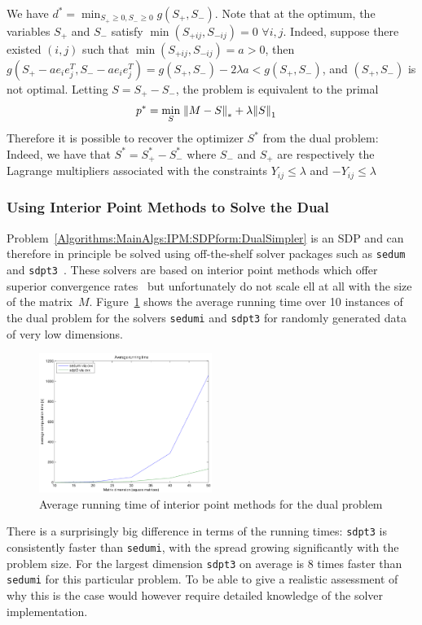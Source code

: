 \documentclass{../../common/projectreport}
\begin{document}
We have $d^* = \min_{S_+\geq 0, S_-\geq 0} g(S_+, S_-)$. Note that at the optimum, the variables $S_+$ and $S_-$ satisfy $\min (S_{+ij}, S_{-ij}) = 0$ $\forall i,j$. Indeed, suppose there existed $(i,j)$ such that $\min(S_{+ij}, S_{-ij}) = a > 0$, then $g(S_+ - ae_ie_j^T, S_- - ae_ie_j^T) = g(S_+, S_-) - 2\lambda a < g(S_+, S_-)$, and $(S_+, S_-)$ is not optimal. Letting $S = S_+ - S_-$, the problem is equivalent to the primal~
\begin{align*}
p^* = \min_{S} \; &{\left\|M-S\right\|}_{*}^{} + \lambda {\left\|S\right\|}_{1}^{} 
\end{align*}
Therefore it is possible to recover the optimizer $S^*$ from the dual problem: Indeed, we have that $S^* = S_+^* - S_-^*$ where $S_-$ and $S_+$ are respectively the Lagrange multipliers associated with the constraints $Y_{ij} \leq \lambda$ and $-Y_{ij} \leq \lambda$



\subsubsection{Using Interior Point Methods to Solve the Dual}
\label{Algorithms:MainAlgs:IPM:Complexity:Subsubsec}

Problem~\eqref{Algorithms:MainAlgs:IPM:SDPform:DualSimpler} is an SDP and can therefore in principle be solved using off-the-shelf solver packages such as \texttt{sedum}~\cite{Sturm:1999uq} and \texttt{sdpt3}~\cite{Toh:1999kx}. These solvers are based on interior point methods which offer superior convergence rates~\cite{Boyd:2004aa} but unfortunately do not scale ell at all with the size of the matrix~$M$. Figure~\ref{Algorithms:MainAlgs:IPM:Complexity:figure} shows the average running time over 10 instances of the dual problem for the solvers \texttt{sedumi} and \texttt{sdpt3} for randomly generated data of very low dimensions. 
%
\begin{figure}[htbp]
\centering
\includegraphics[width=0.5\textwidth]{../figures/intpt_comparison}
\caption{Average running time of interior point methods for the dual problem}
\label{Algorithms:MainAlgs:IPM:Complexity:figure}
\end{figure}
%
There is a surprisingly big difference in terms of the running times: \texttt{sdpt3} is consistently faster than \texttt{sedumi}, with the spread growing significantly with the problem size. For the largest dimension \texttt{sdpt3} on average is 8 times faster than \texttt{sedumi} for this particular problem. To be able to give a realistic assessment of why this is the case would however require detailed knowledge of the solver implementation. 
\end{document}
